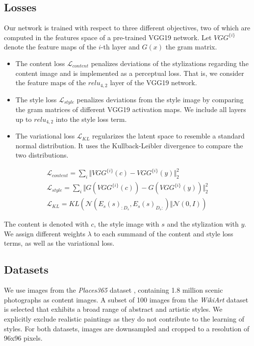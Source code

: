 \documentclass[10pt,twocolumn,letterpaper]{article}
\begin{document}
	
\subsection{Losses}

Our network is trained with respect to three different objectives, two of which are computed in the features space of a pre-trained VGG19 network. Let $VGG^{\{i\}}$ denote the feature maps of the $i$-th layer and $G(x)$ the gram matrix.
\begin{itemize}
	\item The content loss $\mathcal{L}_{content}$ penalizes deviations of the stylizations regarding the content image and is implemented as a perceptual loss. That is, we consider the feature maps of the $relu_{4,2}$ layer of the VGG19 network.
	\item The style loss $\mathcal{L}_{style}$ penalizes deviations from the style image by comparing the gram matrices of different VGG19 activation maps. We include all layers up to $relu_{4,2}$ into the style loss term.
	\item The variational loss $\mathcal{L}_{KL}$ regularizes the latent space to resemble a standard normal distribution. It uses the Kullback-Leibler divergence to compare the two distributions.
\end{itemize}
\begin{multline*}
\mathcal{L}_{content} = \sum_{i} \Vert VGG^{\{i\}}(c) - VGG^{\{i\}}(y)\Vert_2^2 \\
\mathcal{L}_{style} = \sum_{i} \Vert G(VGG^{\{i\}}(c)) - G(VGG^{\{i\}}(y))\Vert_2^2 \\
\mathcal{L}_{KL} = KL(\mathcal{N}(E_s(s)_{:D_s}, E_s(s)_{D_s:}) \Vert \mathcal{N}(0, I))
\end{multline*}

The content is denoted with $c$, the style image with $s$ and the stylization with $y$. We assign different weights $\lambda$ to each summand of the content and style loss terms, as well as the variational loss.

\subsection{Datasets}

We use images from the \textit{Places365} dataset \cite{places365}, containing 1.8 million scenic photographs as content images. A subset of 100 images from the \textit{WikiArt} dataset is selected that exhibits a broad range of abstract and artistic styles. We explicitly exclude realistic paintings as they do not contribute to the learning of styles. For both datasets, images are downsampled and cropped to a resolution of 96x96 pixels.
\end{document}
